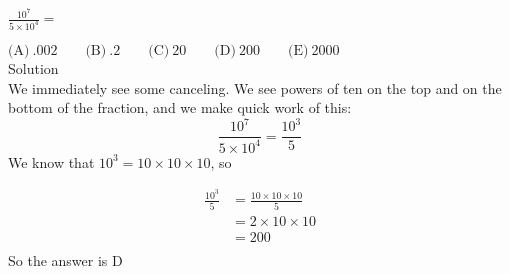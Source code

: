 

$\frac{10^7}{5\times 10^4}=$


$\text{(A)}\ .002 \qquad \text{(B)}\ .2 \qquad \text{(C)}\ 20 \qquad \text{(D)}\ 200 \qquad \text{(E)}\ 2000$
\\
Solution
\\
We immediately see some canceling. We see powers of ten on the top and on the bottom of the fraction, and we make quick work of this: \[\frac{10^7}{5 \times 10^4} = \frac{10^3}{5}\]
We know that $10^3 = 10 \times 10 \times 10$, so

\begin{align*} \frac{10^3}{5} &= \frac{10\times 10\times 10}{5} \\ &= 2\times 10\times 10 \\ &= 200 \\ \end{align*}
So the answer is $\boxed{\text{D}}$
